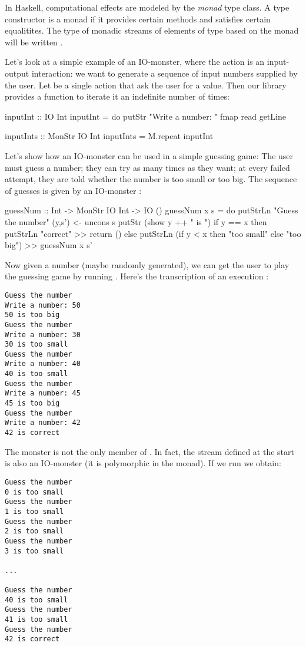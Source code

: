 \documentclass{jfp}
\begin{document}
In Haskell, computational effects are modeled by the {\em monad} type class.
A type constructor  is a monad if it provides certain methods and satisfies certain equalitites.
The type of monadic streams of elements of type  based on the monad  will be written .

Let's look at a simple example of an IO-monster, where the action is an input-output interaction: we want to generate a sequence of input numbers supplied by the user.
Let  be a single action that ask the user for a value.
Then our library provides a  function to iterate it an indefinite number of times:
\begin{haskell}
inputInt :: IO Int
inputInt = do
  putStr "Write a number: "
  fmap read getLine

inputInts :: MonStr IO Int
inputInts = M.repeat inputInt
\end{haskell}

Let's show how an IO-monster can be used in a simple guessing game:
The user must guess a number; they can try as many times as they want; at every failed attempt, they are told whether the number is too small or too big.
The sequence of guesses is given by an IO-monster :
\begin{haskell}
guessNum :: Int -> MonStr IO Int -> IO ()
guessNum x s = do
  putStrLn "Guess the number"
  (y,s') <- uncons s
  putStr (show y ++ " is ")
  if y == x
    then putStrLn "correct" >> return ()
    else putStrLn (if y < x then "too small" else "too big") >> guessNum x s'
\end{haskell}

Now given a number  (maybe randomly generated), we can get the user to play the guessing game by running .
Here's the transcription of an execution :
\begin{verbatim}
Guess the number
Write a number: 50
50 is too big
Guess the number
Write a number: 30
30 is too small
Guess the number
Write a number: 40
40 is too small
Guess the number
Write a number: 45
45 is too big
Guess the number
Write a number: 42
42 is correct
\end{verbatim}

The monster  is not the only member of .
In fact, the stream  defined at the start is also an IO-monster (it is polymorphic in the monad).
If we run  we obtain:
\begin{verbatim}
Guess the number
0 is too small
Guess the number
1 is too small
Guess the number
2 is too small
Guess the number
3 is too small

...

Guess the number
40 is too small
Guess the number
41 is too small
Guess the number
42 is correct
\end{verbatim}
\end{document}
